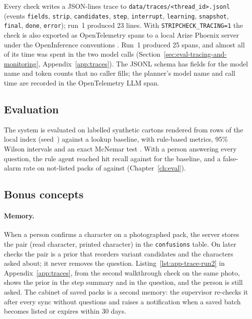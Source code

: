 Every check writes a JSON-lines trace to \texttt{data/traces/<thread\_id>.jsonl} (events \texttt{fields}, \texttt{strip}, \texttt{candidates}, \texttt{step}, \texttt{interrupt}, \texttt{learning}, \texttt{snapshot}, \texttt{final}, \texttt{done}, \texttt{error}); run~1 produced 23 lines. With \texttt{STRIPCHECK\_TRACING=1} the check is also exported as OpenTelemetry spans to a local Arize Phoenix server under the OpenInference conventions \cite{otel2026genai,arize2026openinference}. Run~1 produced 25 spans, and almost all of its time was spent in the two model calls (Section~\ref{sec:eval-tracing-and-monitoring}, Appendix~\ref{app:traces}). The JSONL schema has fields for the model name and token counts that no caller fills; the planner's model name and call time are recorded in the OpenTelemetry LLM span.

\subsection{Evaluation}
\label{sec:concepts-evaluation}

The system is evaluated on \ResN{} labelled synthetic cartons rendered from rows of the local index (seed~\ResSeed{}) against a lookup baseline, with rule-based metrics, 95\% Wilson intervals \cite{wilson1927probable} and an exact McNemar test \cite{mcnemar1947note}. With a person answering every question, the rule agent reached hit recall \ResRulesOracleHitRecallK{} against \ResBaseOracleHitRecallK{} for the baseline, and a false-alarm rate on not-listed packs of \ResRulesOracleFARK{} against \ResBaseOracleFARK{} (Chapter~\ref{ch:eval}).

\subsection{Bonus concepts}
\label{sec:concepts-bonus}

\paragraph{Memory.} When a person confirms a character on a photographed pack, the server stores the pair (read character, printed character) in the \texttt{confusions} table. On later checks the pair is a prior that reorders variant candidates and the characters asked about; it never removes the question. Listing~\ref{lst:app-trace-run2} in Appendix~\ref{app:traces}, from the second walkthrough check on the same photo, shows the prior in the step summary and in the question, and the person is still asked. The cabinet of saved packs is a second memory: the supervisor re-checks it after every sync without questions and raises a notification when a saved batch becomes listed or expires within 30 days.


